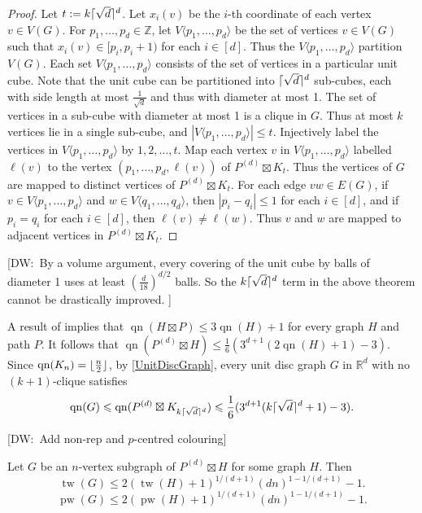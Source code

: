 \documentclass{patmorin}
\newcommand{\note}[2]{{\color{red}[#1:~#2]}}
\DeclareMathOperator{\tw}{tw}
\DeclareMathOperator{\pw}{pw}
\DeclareMathOperator{\qn}{qn}
\DeclarePairedDelimiter{\ceil}{\lceil}{\rceil}
\DeclarePairedDelimiter{\floor}{\lfloor}{\rfloor}
\renewcommand{\leq}{\leqslant}
\begin{document}
\begin{proof}
Let $t:= k \ceil{\sqrt{d}}^d$. 
Let $x_i(v)$ be the $i$-th coordinate of each vertex $v\in V(G)$. 
For $p_1,\dots,p_d\in\mathbb{Z}$, let $V\langle p_1,\dots,p_d\rangle$ be the set of vertices $v\in V(G)$ such that $x_i(v)\in[p_i,p_i+1)$ for each $i\in[d]$. Thus the  $V\langle p_1,\dots,p_d\rangle$ partition $V(G)$. 
Each set $V\langle p_1,\dots,p_d\rangle$ consists of the set of vertices in a particular unit cube. Note that the unit cube can be partitioned into $\ceil{\sqrt{d}}^d$  sub-cubes, each with side length at most $\frac{1}{\sqrt{d}}$ and thus with diameter at most 1. The set of vertices in a sub-cube with diameter at most 1 is a clique in $G$. Thus at most $k$ vertices lie in a single sub-cube, and  $|V\langle p_1,\dots,p_d\rangle | \leq t$.  Injectively label the vertices in $V\langle p_1,\dots,p_d\rangle$ by $1,2,\dots,t$. 
Map each vertex $v$ in 
$V\langle p_1,\dots,p_d\rangle$ labelled $\ell(v)$ to the vertex  $(p_1,\dots,p_d,\ell(v))$ of 
$P^{(d)} \boxtimes K_{t}$. 
Thus the vertices of $G$ are mapped to distinct vertices of $P^{(d)} \boxtimes K_{t}$. 
For each edge $vw\in E(G)$, if $v\in V\langle p_1,\dots,p_d\rangle$ and 
$w\in V\langle q_1,\dots,q_d\rangle$, then $|p_i-q_i|\leq 1$ for each $i\in[d]$, and if $p_i=q_i$ for each $i\in[d]$, then $\ell(v)\neq\ell(w)$. Thus $v$ and $w$ are mapped to adjacent vertices in 
$P^{(d)} \boxtimes K_{t}$. 
\end{proof}

\note{DW}{By a volume argument, every covering of the unit cube by balls of diameter 1 uses at least $(\frac{d}{18})^{d/2}$ balls. So the $k \ceil{\sqrt{d}}^d$ term in the above theorem cannot be drastically improved. }

A result of \citet{Wood-Queue-DMTCS05} implies that $\qn(H \boxtimes P ) \leq 3 \qn(H)+ 1$ for every graph $H$ and path $P$. It follows that  $\qn( P^{(d)} \boxtimes H ) \leq \frac{1}{6} (  3^{d+1} (2 \qn(H) + 1 ) -3 )$. 
Since $\qn(K_n)=\floor{\frac{n}{2}}$, by \cref{UnitDiscGraph}, every unit disc graph $G$ in $\mathbb{R}^d$ with no $(k+1)$-clique satisfies
$$\qn(G) \leq \qn( P^{(d)} \boxtimes K_{k \ceil{\sqrt{d}}^d} ) 
\leq
\frac{1}{6} (  3^{d+1} (k \ceil{\sqrt{d}}^d + 1 ) -3 ).$$

\note{DW}{Add non-rep and $p$-centred colouring}

\begin{lem}
\label{TWhighDimProduct}
Let $G$ be an $n$-vertex subgraph of $P^{(d)} \boxtimes H$ for some graph $H$. 
Then 
$$\tw(G) \leq 2  ( \tw(H)+1)^{ 1/(d+1) } (dn)^{1- 1/(d+1)}   -  1.$$
$$\pw(G) \leq 2  ( \pw(H)+1)^{ 1/(d+1) } (dn)^{1- 1/(d+1)}   -  1.$$
\end{lem}
\end{document}
